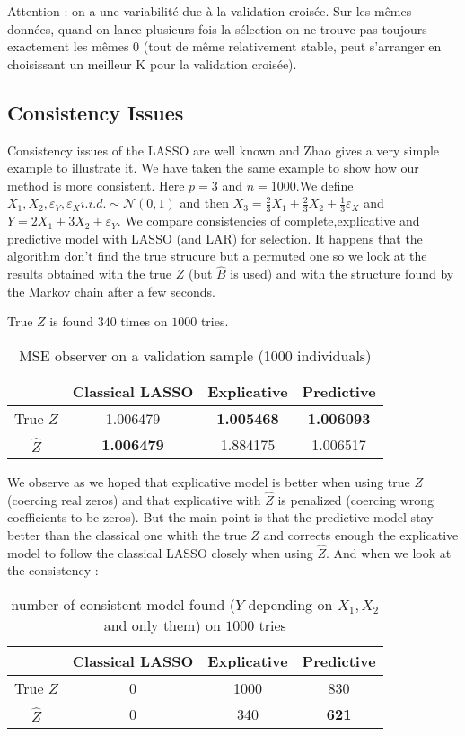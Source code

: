\documentclass[11pt,a4paper]{article}
\begin{document}
		Attention : on a une variabilité due à la validation croisée. Sur les mêmes données, quand on lance plusieurs fois la sélection on ne trouve pas toujours exactement les mêmes 0 (tout de même relativement stable, peut s'arranger en choisissant un meilleur K pour la validation croisée).
		
	\subsection{Consistency Issues}\label{consistency}
		Consistency issues of the LASSO are well known and Zhao \cite{Zhao2006MSC} gives a very simple example to illustrate it.
		We have taken the same example to show how our method is more consistent.
		Here $p=3$ and $n=1000$.We define $X_1,X_2,\varepsilon_Y,\varepsilon_{X} i.i.d. \sim \mathcal{N}(0,1)$ and then $X_3=\frac{2}{3}X_1+\frac{2}{3}X_2+\frac{1}{3}\varepsilon_X$ and $Y=2X_1+3X_2+\varepsilon_Y$.
		We compare consistencies of complete,explicative and predictive model with LASSO (and LAR) for selection.
		It happens that the algorithm don't find the true strucure but a permuted one so we look at the results obtained with the true $Z$ (but $\hat{B}$ is used) and with the structure found by the Markov chain after a few seconds.
		
		True $Z$ is found $340$ times on $1000$ tries.
		
		\begin{table}[h!]
		\centering
		\begin{tabular}{|c|c|c|c|}
		\hline 
		 & Classical LASSO & Explicative & Predictive \\ 
		\hline 
		True $Z$ &  1.006479 & \textbf{1.005468} & \textbf{1.006093} \\ 
		\hline 
		$\hat{Z}$ & \textbf{1.006479} & 1.884175 & 1.006517 \\ 
		\hline 
		\end{tabular} 
		\caption{MSE observer on a validation sample (1000 individuals)}
		\end{table}

		We observe as we hoped that explicative model is better when using true $Z$ (coercing real zeros) and that explicative with $\hat{Z}$ is penalized (coercing wrong coefficients to be zeros).
		But the main point is that the predictive model stay better than the classical one whith the true $Z$ and corrects enough the explicative model to follow the classical LASSO closely when using $\hat{Z}$. 
		And when we look at the consistency :
		\begin{table}[h!]	
		\centering
		\begin{tabular}{|c|c|c|c|}
		\hline 
		 & Classical LASSO & Explicative & Predictive \\ 
		\hline 
		True $Z$ &  0 & 1000 & 830 \\ 
		\hline 
		$\hat{Z}$ & 0 & 340 & \textbf{621} \\ 
		\hline 
		\end{tabular} 
		\caption{number of consistent model found ($Y$ depending on $X_1,X_2$ and only them) on $1000$ tries}
		\end{table}				
		
\end{document}
